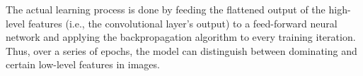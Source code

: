 The actual learning process is done by feeding the flattened output of the high-level features (i.e., the convolutional layer's output) to a feed-forward neural network and applying the backpropagation algorithm to every training iteration. Thus, over a series of epochs, the model can distinguish between dominating and certain low-level features in images.